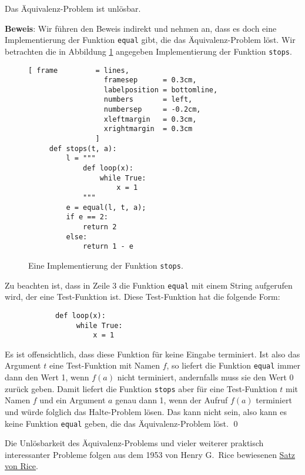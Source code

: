 \begin{Theorem}[Rice, 1953]
Das Äquivalenz-Problem ist unlösbar.  
\end{Theorem}

\noindent
\textbf{Beweis}:
Wir führen den Beweis indirekt und nehmen
an, dass es doch eine Implementierung der Funktion \texttt{equal} gibt, die das
Äquivalenz-Problem löst.  Wir betrachten die in Abbildung 
\ref{fig:stops} angegeben Implementierung der Funktion \texttt{stops}.


\begin{figure}[!h]
  \centering
\begin{Verbatim}[ frame         = lines, 
                  framesep      = 0.3cm, 
                  labelposition = bottomline,
                  numbers       = left,
                  numbersep     = -0.2cm,
                  xleftmargin   = 0.3cm,
                  xrightmargin  = 0.3cm
                ]
     def stops(t, a):
         l = """
             def loop(x): 
                 while True:
                     x = 1
             """ 
         e = equal(l, t, a);
         if e == 2:
             return 2
         else:
             return 1 - e
\end{Verbatim}
  \vspace*{-0.3cm}
  \caption{Eine Implementierung der Funktion \texttt{stops}.}
  \label{fig:stops}
\end{figure}

Zu beachten ist, dass in Zeile 3 die Funktion \texttt{equal} mit einem String aufgerufen
wird, der eine Test-Funktion ist.  Diese 
Test-Funktion hat die
folgende Form:
\begin{verbatim}
            def loop(x): 
                 while True:
                     x = 1
\end{verbatim}
Es ist offensichtlich, dass diese Funktion für keine Eingabe terminiert.
Ist also das Argument $t$ eine Test-Funktion mit Namen $f$, so liefert die Funktion
\texttt{equal} immer dann den Wert 1, 
wenn $f(a)$ nicht terminiert, andernfalls muss sie den Wert 0 zurück geben.
Damit liefert die Funktion \texttt{stops} aber für eine Test-Funktion $t$ mit Namen $f$
und ein Argument $a$ genau dann 1, wenn der Aufruf $f(a)$ terminiert und würde folglich das Halte-Problem
lösen.  Das kann nicht sein, also kann es keine Funktion  \texttt{equal}
geben, die das Äquivalenz-Problem löst. 
\qed
\vspace*{0.3cm}

\noindent
Die Unlösbarkeit des Äquivalenz-Problems und vieler weiterer praktisch interessanter
Probleme folgen aus dem 1953 von Henry G.~Rice \cite{rice:53} bewiesenen
\href{http://de.wikipedia.org/wiki/Satz_von_Rice}{Satz von Rice}.

